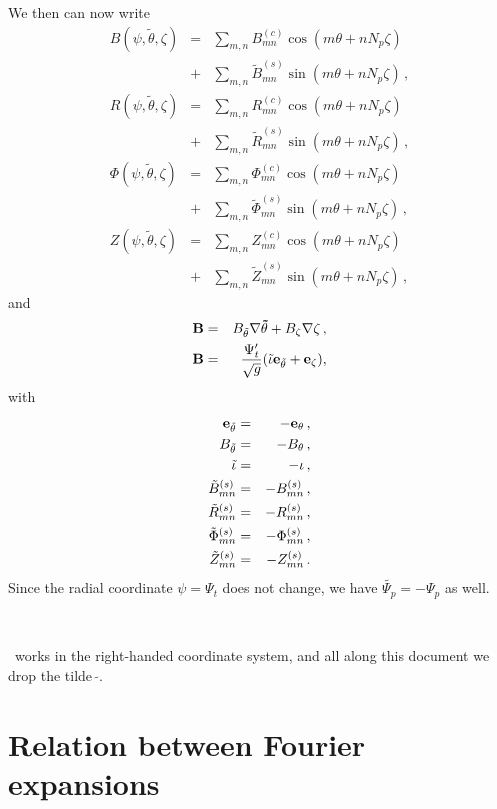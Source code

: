 We then can now write
\begin{eqnarray}
B(\psi,\tilde{\theta},\zeta) &=& \sum_{m,n}B_{mn}^{(c)}\cos{(m\theta+nN_p\zeta)}\nonumber\\
&+& \sum_{m,n}\tilde{B}_{mn}^{(s)}\sin{(m\theta+nN_p\zeta)}\,,\nonumber\\
R(\psi,\tilde{\theta},\zeta) &=& \sum_{m,n}R_{mn}^{(c)}\cos{(m\theta+nN_p\zeta)}\nonumber\\
&+& \sum_{m,n}\tilde{R}_{mn}^{(s)}\sin{(m\theta+nN_p\zeta)}\,,\nonumber\\
\Phi(\psi,\tilde{\theta},\zeta) &=& \sum_{m,n}\Phi_{mn}^{(c)}\cos{(m\theta+nN_p\zeta)}\nonumber\\
&+& \sum_{m,n}\tilde{\Phi}_{mn}^{(s)}\sin{(m\theta+nN_p\zeta)}\,,\nonumber\\
Z(\psi,\tilde{\theta},\zeta) &=& \sum_{m,n}Z_{mn}^{(c)}\cos{(m\theta+nN_p\zeta)}\nonumber\\
&+& \sum_{m,n}\tilde{Z}_{mn}^{(s)}\sin{(m\theta+nN_p\zeta)}\,,
\end{eqnarray}
and
\begin{eqnarray}
\mathbf{B} &=& B_{\tilde{\theta}}\mathbf{\nabla \tilde{\theta}} + B_\zeta\mathbf{\nabla \zeta}\,,\nonumber\\
\mathbf{B} &=& \frac{\Psi_t'}{\sqrt{g}}(\tilde{\iota}\mathbf{e}_{\tilde{\theta}} + \mathbf{e}_\zeta),
\end{eqnarray}
with
\begin{eqnarray}
\mathbf{e}_{\tilde{\theta}} &=& -\mathbf{e}_\theta\,,\nonumber\\
B_{\tilde{\theta}} &=& -B_\theta\,,\nonumber\\
\tilde{\iota} &=& -\iota\,,\nonumber\\
\tilde{B}_{mn}^{(s)} &=& -B_{mn}^{(s)}\,,\nonumber\\
\tilde{R}_{mn}^{(s)} &=& -R_{mn}^{(s)}\,,\nonumber\\
\tilde{\Phi}_{mn}^{(s)} &=& -\Phi_{mn}^{(s)}\,,\nonumber\\
\tilde{Z}_{mn}^{(s)} &=& -Z_{mn}^{(s)}\,.\label{EQ_FOURIER}
\end{eqnarray}
Since the radial coordinate $\psi=\Psi_t$ does not change, we have $\tilde{\Psi_p} = -\Psi_p$ as well.

\

\KNOSOS~works in the right-handed coordinate system, and all along this document we drop the tilde~$\tilde{}$.


\section{Relation between Fourier expansions}\label{SEC_FOURIER}


